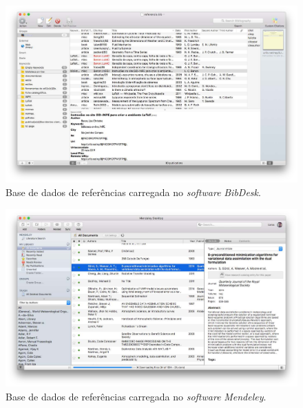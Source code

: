 \begin{figure}[H]
\caption{Base de dados de referências carregada no \textit{software} \textit{BibDesk}.}
\vspace{6mm}
    \begin{center}
        \includegraphics[scale=0.3]{./docs/figs/bibdesk.pdf}
    \end{center}
\vspace{4mm}
\label{fig:exe_bibdesk}
\end{figure}

\begin{figure}[H]
\caption{Base de dados de referências carregada no \textit{software} \textit{Mendeley}.}
\vspace{6mm}
    \begin{center}
        \includegraphics[scale=0.3]{./docs/figs/mendeley.pdf}
    \end{center}
\vspace{4mm}
\label{fig:exe_mendeley}
\end{figure}

